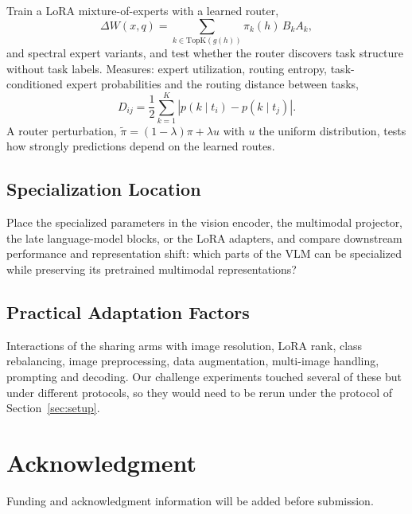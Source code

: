\documentclass[journal,twoside,web]{ieeecolor}
\begin{document}
Train a LoRA mixture-of-experts with a learned router,
\begin{equation}
\Delta W(x,q)=\sum_{k\in\mathrm{TopK}(g(h))}\pi_k(h)\,B_kA_k,
\end{equation}
and spectral expert variants, and test whether the router discovers task
structure without task labels. Measures: expert utilization, routing
entropy, task-conditioned expert probabilities and the routing distance
between tasks,
\begin{equation}
D_{ij}=\frac{1}{2}\sum_{k=1}^{K}\left|p(k\mid t_i)-p(k\mid t_j)\right|.
\end{equation}
A router perturbation, $\tilde{\pi}=(1-\lambda)\pi+\lambda u$ with $u$ the
uniform distribution, tests how strongly predictions depend on the learned
routes.

\subsection{Specialization Location}

Place the specialized parameters in the vision encoder, the multimodal
projector, the late language-model blocks, or the LoRA adapters, and compare
downstream performance and representation shift: which parts of the VLM can
be specialized while preserving its pretrained multimodal representations?

\subsection{Practical Adaptation Factors}

Interactions of the sharing arms with image resolution, LoRA rank, class
rebalancing, image preprocessing, data augmentation, multi-image handling,
prompting and decoding. Our challenge experiments touched several of these
but under different protocols, so they would need to be rerun under the
protocol of Section~\ref{sec:setup}.


\section*{Acknowledgment}

Funding and acknowledgment information will be added before submission.




\end{document}
